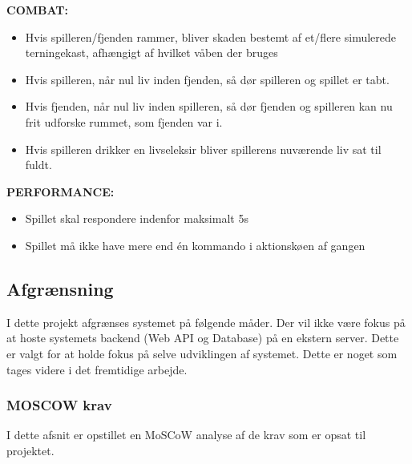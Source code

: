 \textbf{COMBAT:}

\begin{itemize}
  \item Hvis spilleren/fjenden rammer, bliver skaden bestemt af et/flere simulerede terningekast, afhængigt af hvilket våben der bruges
  \item Hvis spilleren, når nul liv inden fjenden, så dør spilleren og spillet er tabt.
  \item Hvis fjenden, når nul liv inden spilleren, så dør fjenden og spilleren kan nu frit udforske rummet, som fjenden var i.
  \item Hvis spilleren drikker en livseleksir bliver spillerens nuværende liv sat til fuldt.
\end{itemize}

\textbf{PERFORMANCE:}    

\begin{itemize}
  \item Spillet skal respondere indenfor maksimalt 5s
  \item Spillet må ikke have mere end én kommando i aktionskøen af gangen
\end{itemize}

\newpage

\subsection{Afgrænsning}
I dette projekt afgrænses systemet på følgende måder. Der vil ikke være fokus på at hoste systemets backend (Web API og Database) på en ekstern server.
Dette er valgt for at holde fokus på selve udviklingen af systemet. Dette er noget som tages videre i det fremtidige arbejde.  

\subsubsection{MOSCOW krav}
\label{sssec:MOSCOW}
I dette afsnit er opstillet en MoSCoW analyse af de krav som er opsat til projektet.\\

